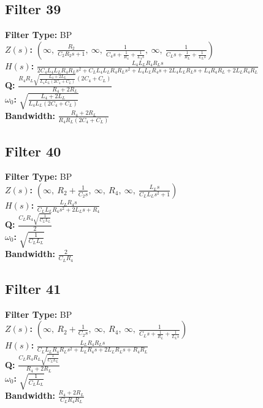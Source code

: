 \documentclass{article}
\begin{document}
\subsection*{Filter 39}
\textbf{Filter Type:} BP \\ 
\textbf{$Z(s)$:} $\left( \infty, \  \frac{R_{2}}{C_{2} R_{2} s + 1}, \  \infty, \  \frac{1}{C_{4} s + \frac{1}{R_{4}} + \frac{1}{L_{4} s}}, \  \infty, \  \frac{1}{C_{L} s + \frac{1}{R_{L}} + \frac{1}{L_{L} s}}\right)$ \\ 
\textbf{$H(s)$:} $\frac{L_{4} L_{L} R_{4} R_{L} s}{2 C_{4} L_{4} L_{L} R_{4} R_{L} s^{2} + C_{L} L_{4} L_{L} R_{4} R_{L} s^{2} + L_{4} L_{L} R_{4} s + 2 L_{4} L_{L} R_{L} s + L_{4} R_{4} R_{L} + 2 L_{L} R_{4} R_{L}}$ \\ 
\textbf{Q:} $\frac{R_{4} R_{L} \sqrt{\frac{L_{4} + 2 L_{L}}{L_{4} L_{L} \left(2 C_{4} + C_{L}\right)}} \left(2 C_{4} + C_{L}\right)}{R_{4} + 2 R_{L}}$ \\ 
\textbf{$\omega_0$:} $\sqrt{\frac{L_{4} + 2 L_{L}}{L_{4} L_{L} \left(2 C_{4} + C_{L}\right)}}$ \\ 
\textbf{Bandwidth:} $\frac{R_{4} + 2 R_{L}}{R_{4} R_{L} \left(2 C_{4} + C_{L}\right)}$ \\ 
\subsection*{Filter 40}
\textbf{Filter Type:} BP \\ 
\textbf{$Z(s)$:} $\left( \infty, \  R_{2} + \frac{1}{C_{2} s}, \  \infty, \  R_{4}, \  \infty, \  \frac{L_{L} s}{C_{L} L_{L} s^{2} + 1}\right)$ \\ 
\textbf{$H(s)$:} $\frac{L_{L} R_{4} s}{C_{L} L_{L} R_{4} s^{2} + 2 L_{L} s + R_{4}}$ \\ 
\textbf{Q:} $\frac{C_{L} R_{4} \sqrt{\frac{1}{C_{L} L_{L}}}}{2}$ \\ 
\textbf{$\omega_0$:} $\sqrt{\frac{1}{C_{L} L_{L}}}$ \\ 
\textbf{Bandwidth:} $\frac{2}{C_{L} R_{4}}$ \\ 
\subsection*{Filter 41}
\textbf{Filter Type:} BP \\ 
\textbf{$Z(s)$:} $\left( \infty, \  R_{2} + \frac{1}{C_{2} s}, \  \infty, \  R_{4}, \  \infty, \  \frac{1}{C_{L} s + \frac{1}{R_{L}} + \frac{1}{L_{L} s}}\right)$ \\ 
\textbf{$H(s)$:} $\frac{L_{L} R_{4} R_{L} s}{C_{L} L_{L} R_{4} R_{L} s^{2} + L_{L} R_{4} s + 2 L_{L} R_{L} s + R_{4} R_{L}}$ \\ 
\textbf{Q:} $\frac{C_{L} R_{4} R_{L} \sqrt{\frac{1}{C_{L} L_{L}}}}{R_{4} + 2 R_{L}}$ \\ 
\textbf{$\omega_0$:} $\sqrt{\frac{1}{C_{L} L_{L}}}$ \\ 
\textbf{Bandwidth:} $\frac{R_{4} + 2 R_{L}}{C_{L} R_{4} R_{L}}$ \\ 
\end{document}
